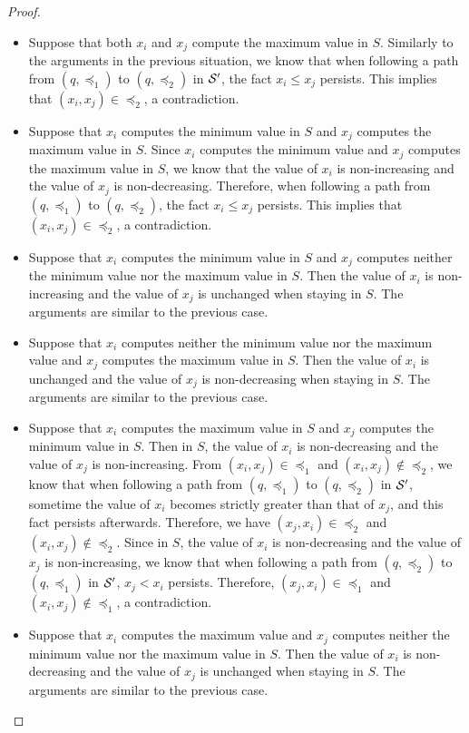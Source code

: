 \begin{appendix}
{\begin{proof}
\begin{itemize}
Therefore, when following a path from $(q, \preceq_1)$ to $(q, \preceq_2)$ in $\Ss'$, the fact $x_i \le x_j$ persists. This implies that $(x_i, x_j) \in \preceq_2$, a contradiction.
%
\item Suppose that both $x_i$ and $x_j$ compute the maximum value in $S$. Similarly to the arguments in the previous situation, we know that when following a path from $(q, \preceq_1)$ to $(q, \preceq_2)$ in $\Ss'$, the fact $x_i \le x_j$ persists. This implies that $(x_i, x_j) \in \preceq_2$, a contradiction.
%
\item Suppose that $x_i$ computes the minimum value in $S$ and $x_j$ computes the maximum value in $S$. Since $x_i$ computes the minimum value and $x_j$ computes the maximum value in $S$, we know that the value of $x_i$ is non-increasing and the value of $x_j$ is non-decreasing. Therefore, when following a path from $(q, \preceq_1)$ to $(q, \preceq_2)$, the fact $x_i \le x_j$ persists. This implies that $(x_i, x_j) \in \preceq_2$, a contradiction.
%
\item Suppose that $x_i$ computes the minimum value in $S$ and $x_j$ computes neither the minimum value nor the maximum value in $S$. Then the value of $x_i$ is non-increasing and the value of $x_j$ is unchanged when staying in $S$. The arguments are similar to the previous case.
%
\item Suppose that $x_i$ computes neither the minimum value nor the maximum value and $x_j$ computes the maximum value in $S$. Then the value of $x_i$ is unchanged and the value of $x_j$ is non-decreasing when staying in $S$. The arguments are similar to the previous case.
%
\item Suppose that $x_i$ computes the maximum value in $S$ and $x_j$ computes the minimum value in $S$.  Then in $S$, the value of $x_i$ is non-decreasing and the value of $x_j$ is non-increasing.  From $(x_i, x_j) \in \preceq_1$ and $(x_i, x_j) \not \in \preceq_2$, we know that when following a path from $(q, \preceq_1)$ to $(q, \preceq_2)$ in $\Ss'$, sometime the value of $x_i$ becomes strictly greater than that of $x_j$, and this fact persists afterwards. Therefore, we have $(x_j, x_i) \in \preceq_2$ and $(x_i, x_j) \not \in \preceq_2$. Since in $S$, the value of $x_i$ is non-decreasing and the value of $x_j$ is non-increasing, we know that when following a path from $(q, \preceq_2)$ to $(q, \preceq_1)$ in $\Ss'$, $x_j < x_i$ persists. Therefore, $(x_j, x_i) \in \preceq_1$ and $(x_i, x_j) \not \in \preceq_1$, a contradiction.
%
\item Suppose that $x_i$ computes the maximum value and  $x_j$ computes neither the minimum value nor the maximum value in $S$. Then the value of $x_i$ is non-decreasing and the value of $x_j$ is unchanged when staying in $S$. The arguments are similar to the previous case.

\end{itemize}
\end{proof}}
\end{appendix}
